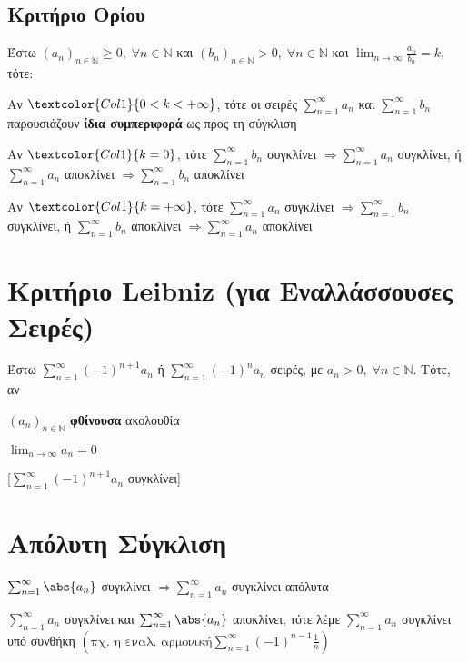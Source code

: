 \subsection{Κριτήριο Ορίου}
Έστω $ {(a_{n})}_{n \in \mathbb{N}} \geq 0, \; \forall n \in \mathbb{N} $ και $
{(b_{n})}_{n \in \mathbb{N}} > 0, \; \forall n \in \mathbb{N} $ 
και $ \lim_{n \to \infty} \frac{a_{n}}{b_{n}} = k  $, τότε: 
\begin{myitemize}
  \item Αν $ \textcolor{Col1}{0 < k < + \infty} $, τότε οι σειρές $ \sum_{n=1}^{\infty} a_{n} $ και $
    \sum_{n=1}^{\infty} b_{n} $ παρουσιάζουν \textbf{ίδια συμπεριφορά} ως προς τη σύγκλιση
  \item Αν $ \textcolor{Col1}{k=0} $, τότε $\sum_{n=1}^{\infty} b_{n} $ συγκλίνει 
    $ \Rightarrow  \sum_{n=1}^{\infty} a_{n} $ συγκλίνει, ή $ \sum_{n=1}^{\infty} a_{n} $
    αποκλίνει $ \Rightarrow \sum_{n=1}^{\infty} b_{n} $ αποκλίνει
  \item Αν $ \textcolor{Col1}{k=+ \infty} $, τότε $\sum_{n=1}^{\infty} a_{n} $ συγκλίνει 
    $ \Rightarrow  \sum_{n=1}^{\infty} b_{n} $ συγκλίνει, ή $ \sum_{n=1}^{\infty} b_{n} $
    αποκλίνει $ \Rightarrow \sum_{n=1}^{\infty} a_{n} $ αποκλίνει
\end{myitemize}

\section{Κριτήριο Leibniz (για Εναλλάσσουσες Σειρές)}

Έστω $ \sum_{n=1}^{\infty} (-1)^{n+1} a_{n} $ ή $ \sum_{n=1}^{\infty} (-1)^{n} a_{n} $ 
σειρές, με $ a_{n} > 0, \; \forall n \in \mathbb{N} $. Τότε, αν 

\parbox{5cm}{
  \begin{myitemize}
    \item $ (a_{n})_{n \in \mathbb{N}} $ \textbf{φθίνουσα} ακολουθία \hfill {}
    \item $ \lim_{n \to \infty} a_{n} = 0 $ \hfill {}
  \end{myitemize}
[$ \sum_{n=1}^{\infty} (-1)^{n+1} a_{n} $ συγκλίνει]}


\section{Απόλυτη Σύγκλιση}

\begin{myitemize}
  \item $ \sum_{n=1}^{\infty} \abs{a_{n}} $ συγκλίνει $ \Rightarrow \sum_{n=1}^{\infty}
    a_{n} $ συγκλίνει \textcolor{Col1}{απόλυτα}
  \item $ \sum_{n=1}^{\infty} a_{n} $ συγκλίνει και $ \sum_{n=1}^{\infty} \abs{a_{n}}
    $ αποκλίνει, τότε λέμε $ \sum_{n=1}^{\infty} a_{n} $ συγκλίνει \textcolor{Col1}{υπό
    συνθήκη} $ \left( \text{πχ. η εναλ. αρμονική} \sum_{n=1}^{\infty} (-1)^{n-1} \frac{1}{n}\right) $
\end{myitemize}







